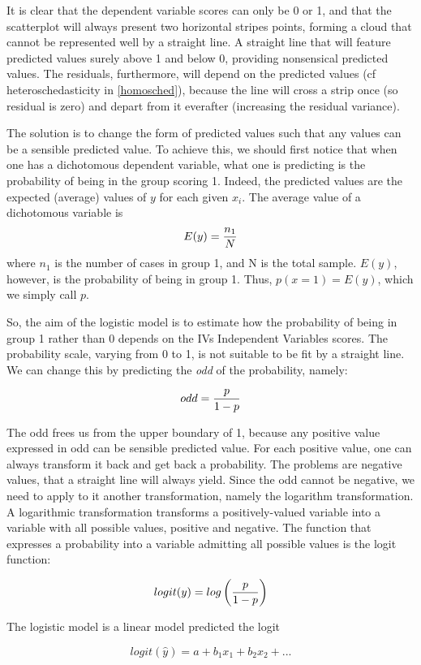 \documentclass[
]{book}
\begin{document}
It is clear that the dependent variable scores can only be 0 or 1, and that the scatterplot will always present two horizontal stripes points, forming a cloud that cannot be represented well by a straight line. A straight line that will feature predicted values surely above 1 and below 0, providing nonsensical predicted values. The residuals, furthermore, will depend on the predicted values (cf heteroschedasticity in \ref{homosched}), because the line will cross a strip once (so residual is zero) and depart from it everafter (increasing the residual variance).

The solution is to change the form of predicted values such that any values can be a sensible predicted value. To achieve this, we should first notice that when one has a dichotomous dependent variable, what one is predicting is the probability of being in the group scoring 1. Indeed, the predicted values are the expected (average) values of \(y\) for each given \(x_i\). The average value of a dichotomous variable is
\[
E(y)={n_1 \over N}
\]
where \(n_1\) is the number of cases in group 1, and N is the total sample. \(E(y)\), however, is the probability of being in group 1. Thus, \(p(x=1)=E(y)\), which we simply call \(p\).

So, the aim of the logistic model is to estimate how the probability of being in group 1 rather than 0 depends on the {IVs {Independent Variables} } scores. The probability scale, varying from 0 to 1, is not suitable to be fit by a straight line. We can change this by predicting the \emph{odd} of the probability, namely:

\[
odd={p \over {1-p}}
\]

The odd frees us from the upper boundary of 1, because any positive value expressed in odd can be sensible predicted value. For each positive value, one can always transform it back and get back a probability. The problems are negative values, that a straight line will always yield. Since the odd cannot be negative, we need to apply to it another transformation, namely the logarithm transformation. A logarithmic transformation transforms a positively-valued variable into a variable with all possible values, positive and negative. The function that expresses a probability into a variable admitting all possible values is the logit function:

\[
logit(y)={log \left( {p \over 1-p} \right)}
\]

The logistic model is a linear model predicted the logit

\[
logit(\hat{y})=a+b_1  x_1+b_2 x_2+ ...
\]
\end{document}

